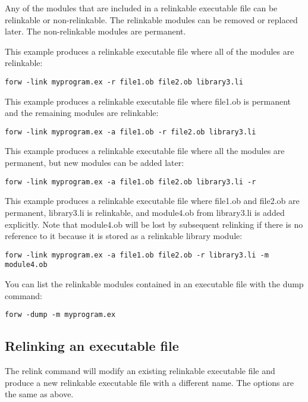 \documentclass[forwardcom.tex]{subfiles}
\begin{document}
Any of the modules that are included in a relinkable executable file can be relinkable or non-relinkable. The relinkable modules can be removed or replaced later. The non-relinkable modules are permanent. 
\vspace{2mm}

This example produces a relinkable executable file where all of the modules are relinkable:
\begin{lstlisting}[frame=single]
forw -link myprogram.ex -r file1.ob file2.ob library3.li
\end{lstlisting}
\vspace{4mm}

This example produces a relinkable executable file where file1.ob is permanent and the remaining modules are relinkable:
\begin{lstlisting}[frame=single]
forw -link myprogram.ex -a file1.ob -r file2.ob library3.li
\end{lstlisting}
\vspace{4mm}

This example produces a relinkable executable file where all the modules are permanent, but new modules can be added later:
\begin{lstlisting}[frame=single]
forw -link myprogram.ex -a file1.ob file2.ob library3.li -r
\end{lstlisting}
\vspace{4mm}

This example produces a relinkable executable file where file1.ob and file2.ob are permanent,  library3.li is relinkable, and module4.ob from library3.li is added explicitly. Note that module4.ob
will be lost by subsequent relinking if there is no reference to it because it is stored as a relinkable library module:
\begin{lstlisting}[frame=single]
forw -link myprogram.ex -a file1.ob file2.ob -r library3.li -m module4.ob
\end{lstlisting}
\vspace{4mm}

You can list the relinkable modules contained in an executable file with the dump command:
\begin{lstlisting}[frame=single]
forw -dump -m myprogram.ex
\end{lstlisting}
\vspace{4mm}


\subsection{Relinking an executable file} \label{relinking}
The relink command will modify an existing relinkable executable file and produce a new relinkable executable file with a different name. The options are the same as above. 
\vspace{2mm}
\end{document}
